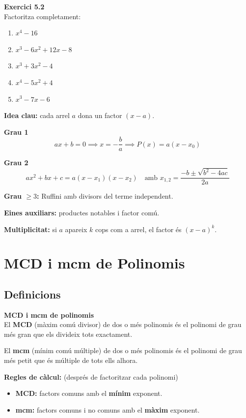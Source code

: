 \documentclass[12pt]{article}
\begin{document}
\begin{exercici}
\textbf{Exercici 5.2}\\
Factoritza completament:
\begin{enumerate}[label=\alph*)]
    \item $x^4-16$
    \item $x^3-6x^2+12x-8$
    \item $x^3+3x^2-4$
    \item $x^4-5x^2+4$
    \item $x^3-7x-6$
\end{enumerate}
\end{exercici}

\begin{resum}[title=Resum 5: Factorització]
\textbf{Idea clau:} cada arrel $a$ dona un factor $(x-a)$.

\textbf{Grau 1}
\[
ax+b=0 \implies x=-\dfrac{b}{a} \implies P(x)=a(x-x_0)
\]

\textbf{Grau 2}
\[
ax^2+bx+c = a(x-x_1)(x-x_2) \quad \text{amb } x_{1,2} = \dfrac{-b \pm \sqrt{b^2-4ac}}{2a}
\]

\textbf{Grau $\ge 3$:} Ruffini amb divisors del terme independent.

\textbf{Eines auxiliars:} productes notables i factor comú.

\textbf{Multiplicitat:} si $a$ apareix $k$ cops com a arrel, el factor és $(x-a)^k$.
\end{resum}

\newpage

\section{MCD i mcm de Polinomis}

\subsection{Definicions}

\begin{concept}
\textbf{MCD i mcm de polinomis}\\
El \textbf{MCD} (màxim comú divisor) de dos o més polinomis és el polinomi de grau més gran que els divideix tots exactament.

El \textbf{mcm} (mínim comú múltiple) de dos o més polinomis és el polinomi de grau més petit que és múltiple de tots ells alhora.

\textbf{Regles de càlcul:} (després de factoritzar cada polinomi)
\begin{itemize}
    \item \textbf{MCD:} factors comuns amb el \textbf{mínim} exponent.
    \item \textbf{mcm:} factors comuns i no comuns amb el \textbf{màxim} exponent.
\end{itemize}
\end{concept}
\end{document}
